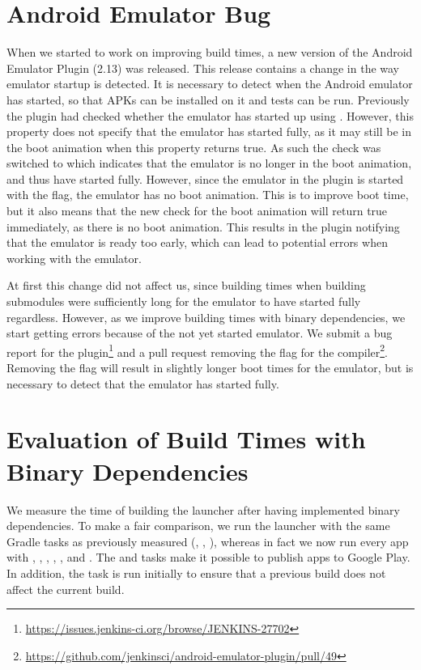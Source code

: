 \section{Android Emulator Bug}\label{sec:emulator_bug}
When we started to work on improving build times, a new version of the Android Emulator Plugin (2.13) was released. This release contains a change in the way emulator startup is detected. It is necessary to detect when the Android emulator has started, so that APKs can be installed on it and tests can be run. Previously the plugin had checked whether the emulator has started up using . However, this property does not specify that the emulator has started fully, as it may still be in the boot animation when this property returns true. As such the check was switched to   which indicates that the emulator is no longer in the boot animation, and thus have started fully. However, since the emulator in the plugin is started with the  flag, the emulator has no boot animation. This is to improve boot time, but it also means that the new check for the boot animation will return true immediately, as there is no boot animation. This results in the plugin notifying that the emulator is ready too early, which can lead to potential errors when working with the emulator.

At first this change did not affect us, since building times when building submodules were sufficiently long for the emulator to have started fully regardless. However, as we improve building times with binary dependencies, we start getting errors because of the not yet started emulator. We submit a bug report for the plugin\footnote{\url{https://issues.jenkins-ci.org/browse/JENKINS-27702}} and a pull request removing the  flag for the compiler\footnote{\url{https://github.com/jenkinsci/android-emulator-plugin/pull/49}}. Removing the  flag will result in slightly longer boot times for the emulator, but is necessary to detect that the emulator has started fully.

\section{Evaluation of Build Times with Binary Dependencies}\label{sec:faster_build_evaluation}
We measure the time of building the launcher after having implemented binary dependencies. To make a fair comparison, we run the launcher with the same Gradle tasks as previously measured (, , ), whereas in fact we now run every app with , , , , , and . The  and  tasks make it possible to publish apps to Google Play. In addition, the  task is run initially to ensure that a previous build does not affect the current build.

